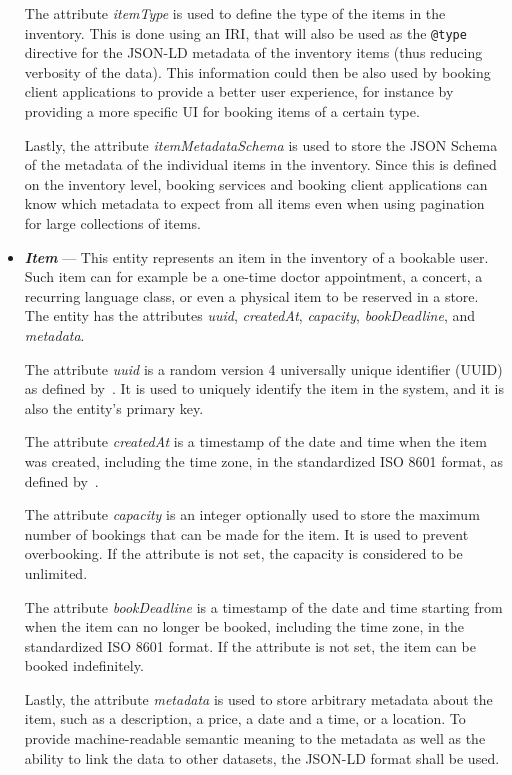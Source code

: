 \begin{itemize}
    The attribute \textit{itemType} is used to define the type of the items in the inventory. This is done using an IRI, that will also be used as the \texttt{@type} directive for the JSON-LD metadata of the inventory items (thus reducing verbosity of the data). This information could then be also used by booking client applications to provide a better user experience, for instance by providing a more specific UI for booking items of a certain type.

    Lastly, the attribute \textit{itemMetadataSchema} is used to store the JSON Schema of the metadata of the individual items in the inventory. Since this is defined on the inventory level, booking services and booking client applications can know which metadata to expect from all items even when using pagination for large collections of items.
    \item \textit{\textbf{Item}} --- This entity represents an item in the inventory of a bookable user. Such item can for example be a one-time doctor appointment, a concert, a recurring language class, or even a physical item to be reserved in a store. The entity has the attributes \textit{uuid}, \textit{createdAt}, \textit{capacity}, \textit{bookDeadline}, and \textit{metadata}.
    
    The attribute \textit{uuid} is a random version 4 universally unique identifier (UUID) as defined by~\cite{rfc4122}. It is used to uniquely identify the item in the system, and it is also the entity's primary key.

    The attribute \textit{createdAt} is a timestamp of the date and time when the item was created, including the time zone, in the standardized ISO 8601 format, as defined by~\cite{iso8601}.

    The attribute \textit{capacity} is an integer optionally used to store the maximum number of bookings that can be made for the item. It is used to prevent overbooking. If the attribute is not set, the capacity is considered to be unlimited.

    The attribute \textit{bookDeadline} is a timestamp of the date and time starting from when the item can no longer be booked, including the time zone, in the standardized ISO 8601 format. If the attribute is not set, the item can be booked indefinitely.

    Lastly, the attribute \textit{metadata} is used to store arbitrary metadata about the item, such as a description, a price, a date and a time, or a location. To provide machine-readable semantic meaning to the metadata as well as the ability to link the data to other datasets, the JSON-LD format shall be used.


\end{itemize}
